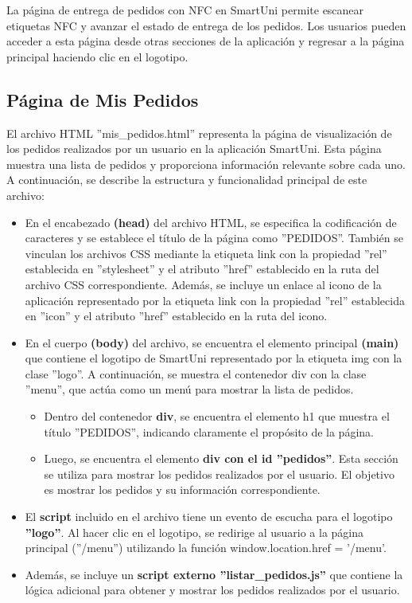 \documentclass[12pt]{report}
\begin{document}
La página de entrega de pedidos con NFC en SmartUni permite escanear etiquetas NFC y avanzar el estado de entrega de los pedidos. Los usuarios pueden acceder a esta página desde otras secciones de la aplicación y regresar a la página principal haciendo clic en el logotipo.

\subsection{Página de Mis Pedidos}
El archivo HTML ''mis\_pedidos.html'' representa la página de visualización de los pedidos realizados por un usuario en la aplicación SmartUni. Esta página muestra una lista de pedidos y proporciona información relevante sobre cada uno. A continuación, se describe la estructura y funcionalidad principal de este archivo:

\begin{itemize}
    \item En el encabezado \textbf{(head)} del archivo HTML, se especifica la codificación de caracteres y se establece el título de la página como ''PEDIDOS''. También se vinculan los archivos CSS mediante la etiqueta link con la propiedad ''rel'' establecida en ''stylesheet'' y el atributo ''href'' establecido en la ruta del archivo CSS correspondiente. Además, se incluye un enlace al icono de la aplicación representado por la etiqueta link con la propiedad ''rel'' establecida en ''icon'' y el atributo ''href'' establecido en la ruta del icono.

    \item En el cuerpo\textbf{ (body)} del archivo, se encuentra el elemento principal \textbf{(main)} que contiene el logotipo de SmartUni representado por la etiqueta img con la clase ''logo''. A continuación, se muestra el contenedor div con la clase ''menu'', que actúa como un menú para mostrar la lista de pedidos.

    \begin{itemize}
        \item Dentro del contenedor \textbf{div}, se encuentra el elemento h1 que muestra el título ''PEDIDOS'', indicando claramente el propósito de la página.
        
        \item Luego, se encuentra el elemento \textbf{div con el id ''pedidos''}. Esta sección se utiliza para mostrar los pedidos realizados por el usuario. El objetivo es mostrar los pedidos y su información correspondiente.
    \end{itemize}

    \item El \textbf{script}  incluido en el archivo tiene un evento de escucha para el logotipo \textbf{''logo''}. Al hacer clic en el logotipo, se redirige al usuario a la página principal (''/menu'') utilizando la función window.location.href = '/menu'.

    \item Además, se incluye un\textbf{ script externo ''listar\_pedidos.js'' }que contiene la lógica adicional para obtener y mostrar los pedidos realizados por el usuario.
\end{itemize}
\end{document}

